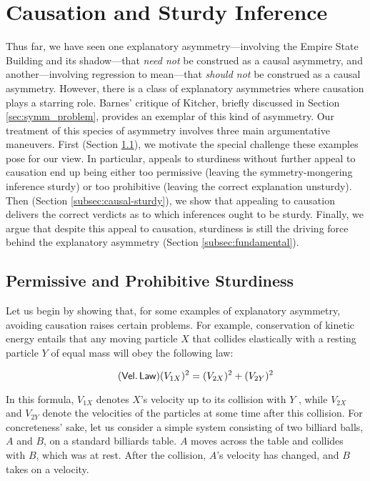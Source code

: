 \documentclass[natbib]{svjour3}                     %
\begin{document}
\section{Causation and Sturdy Inference}
\label{sec:causal}
Thus far, we have seen one explanatory asymmetry---involving the Empire State Building and its shadow---that \textit{need not} be construed as a causal asymmetry, and another---involving regression to mean---that \textit{should not} be construed as a causal asymmetry. However, there is a class of explanatory asymmetries where causation plays a starring role. Barnes' critique of Kitcher, briefly discussed in Section \ref{sec:symm_problem}, provides an exemplar of this kind of asymmetry. Our treatment of this species of asymmetry involves three main argumentative maneuvers. First (Section \ref{subsec:permit-prohibit}), we motivate the special challenge these examples pose for our view.  In particular, appeals to sturdiness without further appeal to causation end up being either too permissive (leaving the symmetry-mongering inference sturdy) or too prohibitive (leaving the correct explanation unsturdy). Then (Section \ref{subsec:causal-sturdy}), we show that appealing to causation delivers the correct verdicts as to which inferences ought to be sturdy. Finally, we argue that despite this appeal to causation, sturdiness is still the driving force behind the explanatory asymmetry (Section \ref{subsec:fundamental}).

\subsection{Permissive and Prohibitive Sturdiness}
\label{subsec:permit-prohibit}

Let us begin by showing that, for some examples of explanatory asymmetry, avoiding causation raises certain problems. For example, conservation of kinetic energy entails that any moving particle $X$ that collides elastically with a resting particle $Y$ of equal mass will obey the following law:  

\begin{equation} 
\label{eq:newtonian}
\tag{$ \mathsf{Vel.\,Law} $}
(V_{1X})^{2} = (V_{2X})^{2} + (V_{2Y})^{2}
\end{equation} 

\noindent In this formula, $V_{1X}$ denotes $X$'s velocity up to its collision with $Y$ , while $V_{2X}$ and $V_{2Y}$ denote the velocities of the particles at some time after this collision. For concreteness' sake, let us consider a simple system consisting of two billiard balls, $A$ and $B$, on a standard billiards table.  $A$ moves across the table and collides with $B$, which was at rest.  After the collision, $A$'s velocity has changed, and $B$ takes on a velocity.
\end{document}
